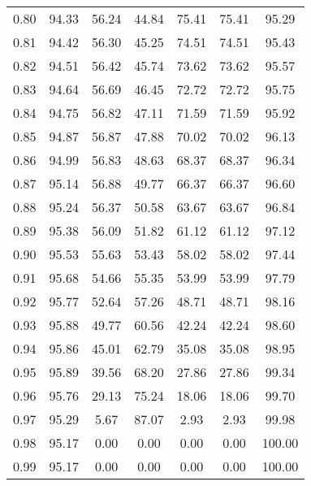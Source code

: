 \begin{tabular}{|c|c|c|c|c|c|c|}
      0.80 &     94.33 &     56.24 &      44.84 &   75.41 &      75.41 &         95.29 \\
      0.81 &     94.42 &     56.30 &      45.25 &   74.51 &      74.51 &         95.43 \\
      0.82 &     94.51 &     56.42 &      45.74 &   73.62 &      73.62 &         95.57 \\
      0.83 &     94.64 &     56.69 &      46.45 &   72.72 &      72.72 &         95.75 \\
      0.84 &     94.75 &     56.82 &      47.11 &   71.59 &      71.59 &         95.92 \\
      0.85 &     94.87 &     56.87 &      47.88 &   70.02 &      70.02 &         96.13 \\
      0.86 &     94.99 &     56.83 &      48.63 &   68.37 &      68.37 &         96.34 \\
      0.87 &     95.14 &     56.88 &      49.77 &   66.37 &      66.37 &         96.60 \\
      0.88 &     95.24 &     56.37 &      50.58 &   63.67 &      63.67 &         96.84 \\
      0.89 &     95.38 &     56.09 &      51.82 &   61.12 &      61.12 &         97.12 \\
      0.90 &     95.53 &     55.63 &      53.43 &   58.02 &      58.02 &         97.44 \\
      0.91 &     95.68 &     54.66 &      55.35 &   53.99 &      53.99 &         97.79 \\
      0.92 &     95.77 &     52.64 &      57.26 &   48.71 &      48.71 &         98.16 \\
      0.93 &     95.88 &     49.77 &      60.56 &   42.24 &      42.24 &         98.60 \\
      0.94 &     95.86 &     45.01 &      62.79 &   35.08 &      35.08 &         98.95 \\
      0.95 &     95.89 &     39.56 &      68.20 &   27.86 &      27.86 &         99.34 \\
      0.96 &     95.76 &     29.13 &      75.24 &   18.06 &      18.06 &         99.70 \\
      0.97 &     95.29 &      5.67 &      87.07 &    2.93 &       2.93 &         99.98 \\
      0.98 &     95.17 &      0.00 &       0.00 &    0.00 &       0.00 &        100.00 \\
      0.99 &     95.17 &      0.00 &       0.00 &    0.00 &       0.00 &        100.00 \\
\bottomrule
\end{tabular}
